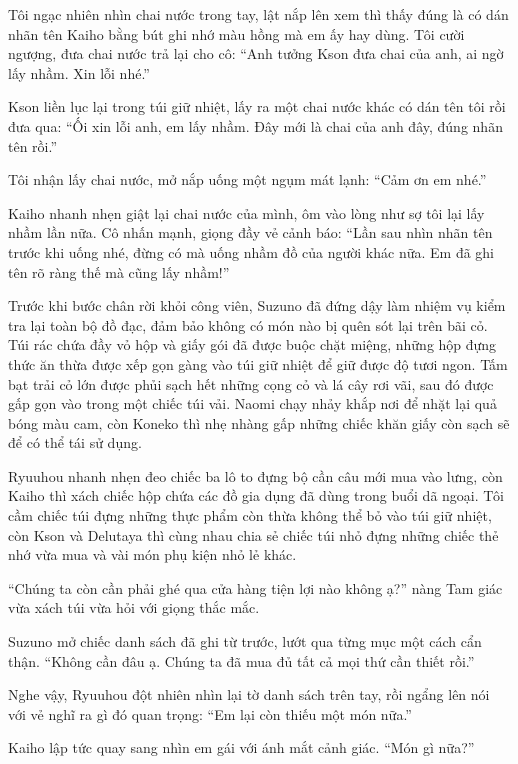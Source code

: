 ﻿\documentclass[../main.tex]{subfiles}
\begin{document}
Tôi ngạc nhiên nhìn chai nước trong tay, lật nắp lên xem thì thấy đúng là có dán nhãn tên Kaiho bằng bút ghi nhớ màu hồng mà em ấy hay dùng. Tôi cười ngượng, đưa chai nước trả lại cho cô: ``Anh tưởng Kson đưa chai của anh, ai ngờ lấy nhầm. Xin lỗi nhé.''

Kson liền lục lại trong túi giữ nhiệt, lấy ra một chai nước khác có dán tên tôi rồi đưa qua: ``Ối xin lỗi anh, em lấy nhầm. Đây mới là chai của anh đây, đúng nhãn tên rồi.''

Tôi nhận lấy chai nước, mở nắp uống một ngụm mát lạnh: ``Cảm ơn em nhé.''

Kaiho nhanh nhẹn giật lại chai nước của mình, ôm vào lòng như sợ tôi lại lấy nhầm lần nữa. Cô nhấn mạnh, giọng đầy vẻ cảnh báo: ``Lần sau nhìn nhãn tên trước khi uống nhé, đừng có mà uống nhầm đồ của người khác nữa. Em đã ghi tên rõ ràng thế mà cũng lấy nhầm!''

\ct

Trước khi bước chân rời khỏi công viên, Suzuno đã đứng dậy làm nhiệm vụ kiểm tra lại toàn bộ đồ đạc, đảm bảo không có món nào bị quên sót lại trên bãi cỏ. Túi rác chứa đầy vỏ hộp và giấy gói đã được buộc chặt miệng, những hộp đựng thức ăn thừa được xếp gọn gàng vào túi giữ nhiệt để giữ được độ tươi ngon. Tấm bạt trải cỏ lớn được phủi sạch hết những cọng cỏ và lá cây rơi vãi, sau đó được gấp gọn vào trong một chiếc túi vải. Naomi chạy nhảy khắp nơi để nhặt lại quả bóng màu cam, còn Koneko thì nhẹ nhàng gấp những chiếc khăn giấy còn sạch sẽ để có thể tái sử dụng.

Ryuuhou nhanh nhẹn đeo chiếc ba lô to đựng bộ cần câu mới mua vào lưng, còn Kaiho thì xách chiếc hộp chứa các đồ gia dụng đã dùng trong buổi dã ngoại. Tôi cầm chiếc túi đựng những thực phẩm còn thừa không thể bỏ vào túi giữ nhiệt, còn Kson và Delutaya thì cùng nhau chia sẻ chiếc túi nhỏ đựng những chiếc thẻ nhớ vừa mua và vài món phụ kiện nhỏ lẻ khác.

``Chúng ta còn cần phải ghé qua cửa hàng tiện lợi nào không ạ?'' nàng Tam giác vừa xách túi vừa hỏi với giọng thắc mắc.

Suzuno mở chiếc danh sách đã ghi từ trước, lướt qua từng mục một cách cẩn thận. ``Không cần đâu ạ. Chúng ta đã mua đủ tất cả mọi thứ cần thiết rồi.''

Nghe vậy, Ryuuhou đột nhiên nhìn lại tờ danh sách trên tay, rồi ngẩng lên nói với vẻ nghĩ ra gì đó quan trọng: ``Em lại còn thiếu một món nữa.''

Kaiho lập tức quay sang nhìn em gái với ánh mắt cảnh giác. ``Món gì nữa?''
\end{document}
